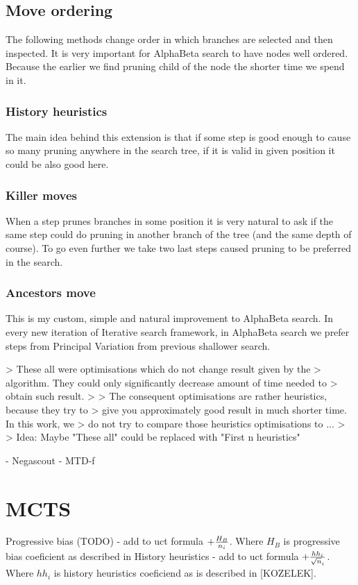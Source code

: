 \documentclass[12pt,titlepage,fleqn]{report}
\begin{document}
\subsection{Move ordering}
	The following methods change order in which branches are selected and
	then inspected. It is very important for AlphaBeta search to have nodes
	well ordered. Because the earlier we find pruning child of the node the
	shorter time we spend in it.
\subsubsection{History heuristics}
	The main idea behind this extension is that if some step is good enough
	to cause so many pruning anywhere in the search tree, if it is valid in
	given position it could be also good here.
\subsubsection{Killer moves}
	When a step prunes branches in some position it is very natural to ask
	if the same step could do pruning in another branch of the tree (and the
	same depth of course). To go even further we take two last steps caused
	pruning to be preferred in the search.
\subsubsection{Ancestors move} %
	This is my custom, simple and natural improvement to AlphaBeta search. In
	every new iteration of Iterative search framework, in AlphaBeta search we
	prefer steps from Principal Variation from previous shallower search.

> These all were optimisations which do not change result given by the
> algorithm. They could only significantly decrease amount of time needed to
> obtain such result.
>
> The consequent optimisations are rather heuristics, because they try to
> give you approximately good result in much shorter time. In this work, we
> do not try to compare those heuristics optimisations to ...
>
> {Idea: Maybe "These all" could be replaced with "First n heuristics"}

- Negascout
- MTD-f


\section{MCTS}
Progressive bias (TODO)
- add to uct formula $+ {H_B \over n_i}$. Where $H_B$ is progressive bias coeficient as described in 
History heuristics
- add to uct formula $+ {hh_i \over \sqrt n_i}$. Where $hh_i$ is history heuristics coeficiend as is described in [KOZELEK].
\end{document}
